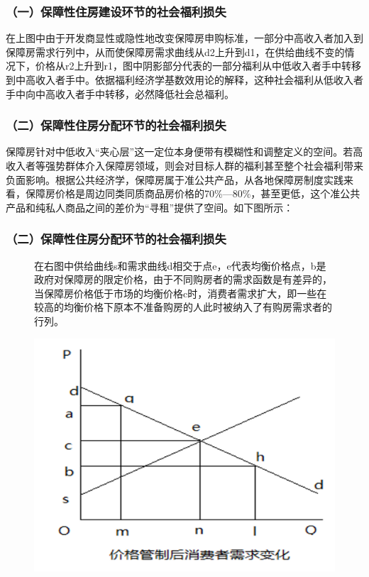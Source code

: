 \documentclass[aspectratio=169, 12pt]{beamer}
\begin{document}
\begin{frame}[plain]
    \frametitle{（一）保障性住房建设环节的社会福利损失}
    在上图中由于开发商显性或隐性地改变保障房申购标准，一部分中高收入者加入到保障房需求行列中，从而使保障房需求曲线从d2上升到d1，在供给曲线不变的情况下，价格从r2上升到r1，图中阴影部分代表的一部分福利从中低收入者手中转移到中高收入者手中。依据福利经济学基数效用论的解释，这种社会福利从低收入者手中向中高收入者手中转移，必然降低社会总福利。
\end{frame}

\begin{frame}[plain]
    \frametitle{（二）保障性住房分配环节的社会福利损失}
    保障房针对中低收入“夹心层”这一定位本身便带有模糊性和调整定义的空间。若高收入者等强势群体介入保障房领域，则会对目标人群的福利甚至整个社会福利带来负面影响。根据公共经济学，保障房属于准公共产品，从各地保障房制度实践来看，保障房价格是周边同类同质商品房价格的70\%---80\%，甚至更低，这个准公共产品和纯私人商品之间的差价为“寻租”提供了空间。如下图所示：
\end{frame}

\begin{frame}[plain]
    \frametitle{（二）保障性住房分配环节的社会福利损失}
    \begin{figure}
        \centering
        \begin{minipage}{0.4\linewidth}
            在右图中供给曲线s和需求曲线d相交于点e，e代表均衡价格点，b是政府对保障房的限定价格，由于不同购房者的需求函数是有差异的，当保障房价格低于市场的均衡价格c时，消费者需求扩大，即一些在较高的均衡价格下原本不准备购房的人此时被纳入了有购房需求者的行列。
        \end{minipage}%
        \begin{minipage}{0.6\linewidth}
            \centering
            \includegraphics[width=1.0\textwidth]{./resources/figure/regulation.png}
        \end{minipage}
        \end{figure}
\end{frame}
\end{document}
